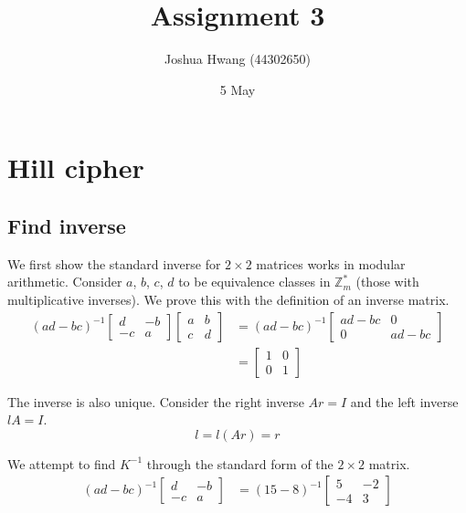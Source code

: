 \documentclass{article}
\title{Assignment 3}
\author{Joshua Hwang (44302650)}
\date{5 May}
\begin{document}
\maketitle

\section{Hill cipher}
\subsection{Find inverse}
We first show the standard inverse for $2\times2$ matrices works in modular
arithmetic. Consider $a$, $b$, $c$, $d$ to be equivalence classes in
$\mathbb{Z}_m^*$ (those with multiplicative inverses).
We prove this with the definition of an inverse matrix.
\begin{align*}
    (ad-bc)^{-1}
    \begin{bmatrix}
        d & -b \\
        -c & a
    \end{bmatrix}
    \begin{bmatrix}
        a & b \\
        c & d
    \end{bmatrix}
    &=
    (ad-bc)^{-1}
    \begin{bmatrix}
        ad-bc & 0 \\
        0 & ad-bc
    \end{bmatrix} \\
    &=
    \begin{bmatrix}
        1 & 0 \\
        0 & 1
    \end{bmatrix}
\end{align*}

The inverse is also unique. Consider the right inverse $Ar=I$ and the left
inverse $lA=I$.
\begin{equation}
    l = l(Ar) = r
\end{equation}

We attempt to find $K^{-1}$ through the standard form of the $2\times2$
matrix.
\begin{align*}
    (ad-bc)^{-1}
    \begin{bmatrix}
        d & -b \\
        -c & a
    \end{bmatrix}
    &=
    (15-8)^{-1}
    \begin{bmatrix}
        5 & -2 \\
        -4 & 3
    \end{bmatrix}
\end{align*}
\end{document}
